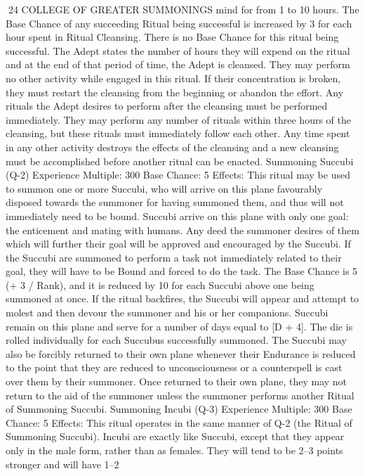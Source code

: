 \documentclass[a4paper]{article}
\begin{document}
\begin{multicols}{3}
24 COLLEGE OF GREATER SUMMONINGS
mind for from 1 to 10 hours. The Base Chance of
any succeeding Ritual being successful is increased
by 3 for each hour spent in Ritual Cleansing. There
is no Base Chance for this ritual being successful.
The Adept states the number of hours they will
expend on the ritual and at the end of that period of
time, the Adept is cleansed. They may perform no
other activity while engaged in this ritual. If their
concentration is broken, they must restart the
cleansing from the beginning or abandon the effort.
Any rituals the Adept desires to perform after the
cleansing must be performed immediately. They
may perform any number of rituals within three
hours of the cleansing, but these rituals must immediately follow each other. Any time spent in any
other activity destroys the effects of the cleansing
and a new cleansing must be accomplished before
another ritual can be enacted.
Summoning Succubi (Q-2)
Experience Multiple: 300
Base Chance: 5%
Effects: This ritual may be used to summon one or
more Succubi, who will arrive on this plane favourably disposed towards the summoner for having summoned them, and thus will not immediately
need to be bound. Succubi arrive on this plane with
only one goal: the enticement and mating with
humans. Any deed the summoner desires of them
which will further their goal will be approved and
encouraged by the Succubi. If the Succubi are
summoned to perform a task not immediately
related to their goal, they will have to be Bound
and forced to do the task. The Base Chance is 5%
(+ 3 / Rank), and it is reduced by 10 for each Succubi above one being summoned at once. If the
ritual backfires, the Succubi will appear and attempt to molest and then devour the summoner and
his or her companions.
Succubi remain on this plane and serve for a number of days equal to [D + 4]. The die is rolled individually for each Succubus successfully summoned. The Succubi may also be forcibly returned
to their own plane whenever their Endurance is
reduced to the point that they are reduced to unconsciousness or a counterspell is cast over them
by their summoner.
Once returned to their own plane, they may not
return to the aid of the summoner unless the summoner performs another Ritual of Summoning
Succubi.
Summoning Incubi (Q-3)
Experience Multiple: 300
Base Chance: 5%
Effects: This ritual operates in the same manner of
Q-2 (the Ritual of Summoning Succubi). Incubi are
exactly like Succubi, except that they appear only
in the male form, rather than as females. They will
tend to be 2–3 points stronger and will have 1–2

\end{multicols}
\end{document}
